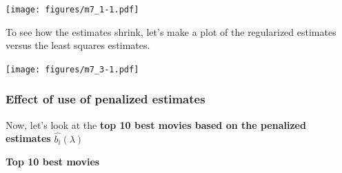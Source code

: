\documentclass[
]{article}
\newenvironment{Shaded}{}{}
\newcommand{\AttributeTok}[1]{\textcolor[rgb]{0.49,0.56,0.16}{#1}}
\newcommand{\FunctionTok}[1]{\textcolor[rgb]{0.02,0.16,0.49}{#1}}
\newcommand{\NormalTok}[1]{#1}
\newcommand{\OtherTok}[1]{\textcolor[rgb]{0.00,0.44,0.13}{#1}}
\newcommand{\SpecialCharTok}[1]{\textcolor[rgb]{0.25,0.44,0.63}{#1}}
\begin{document}
\texttt{[image: figures/m7\_1-1.pdf]}

\begin{Shaded}
\end{Shaded}

To see how the estimates shrink, let's make a plot of the regularized
estimates versus the least squares estimates.

\texttt{[image: figures/m7\_3-1.pdf]}

\newpage

\hypertarget{effect-of-use-of-penalized-estimates}{%
\subsubsection{Effect of use of penalized
estimates}\label{effect-of-use-of-penalized-estimates}}

Now, let's look at the \textbf{top 10 best movies based on the penalized
estimates} \(\hat{b_{i}}(\lambda)\)

\textbf{Top 10 best movies}
\end{document}
